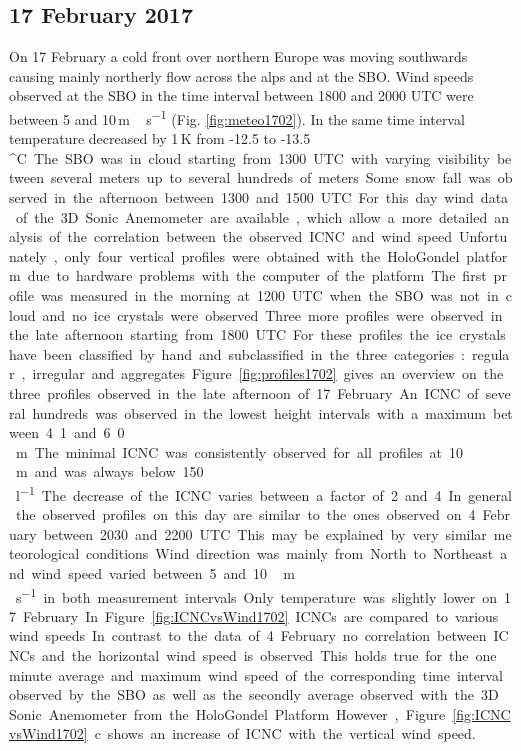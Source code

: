 \documentclass[draft,linenumbers]{agujournal}
\begin{document}
\subsection{17 February 2017}

On 17 February a cold front over northern Europe was moving southwards causing mainly northerly flow across the alps and at the SBO. Wind speeds observed at the SBO in the time interval between 1800 and 2000 UTC were between 5 and 10\,\si{m\,s^{-1}} (Fig. \ref{fig:meteo1702}).  In the same time interval temperature decreased by 1\,\si{K} from -12.5 to -13.5\,\si{^\circ C}. The SBO was in cloud starting from 1300 UTC with varying visibility between several meters up to several hundreds of meters. Some snow fall was observed in the afternoon between 1300 and 1500 UTC. 

For this day wind data of the 3D Sonic Anemometer are available, which allow a more detailed analysis of the correlation between the observed ICNC and wind speed. Unfortunately, only four vertical profiles were obtained with the HoloGondel platform due to hardware problems with the computer of the platform. The first profile was measured in the morning at 1200 UTC when the SBO was not in cloud and no ice crystals were observed. Three more profiles were observed in the late afternoon starting from 1800 UTC. For these profiles the ice crystals have been classified by hand and subclassified in the three categories: regular, irregular and aggregates.

Figure \ref{fig:profiles1702} gives an overview on the three profiles observed in the late afternoon of 17 February. An ICNC of several hundreds was observed in the lowest height intervals with a maximum between 4.1 and 6.0\,\si{m}. The minimal ICNC was consistently observed for all profiles at 10\,\si{m} and was always below 150\,\si{l^{-1}}. The decrease of the ICNC varies between a factor of 2 and 4. In general the observed profiles on this day are similar to the ones observed on 4 February between 2030 and 2200 UTC. This may be explained by very similar meteorological conditions. Wind direction was mainly from North to Northeast and wind speed varied between 5 and 10 \,\si{m\,s^{-1}} in both measurement intervals. Only temperature was slightly lower on 17 February.

In Figure \ref{fig:ICNCvsWind1702} ICNCs are compared to various wind speeds. In contrast to the data of 4 February no correlation between ICNCs and the horizontal wind speed is observed. This holds true for the one minute average and maximum wind speed of the corresponding time interval observed by the SBO as well as the secondly average observed with the 3D Sonic Anemometer from the HoloGondel Platform. However, Figure \ref{fig:ICNCvsWind1702}c shows an increase of ICNC with the vertical wind speed. 
\end{document}

